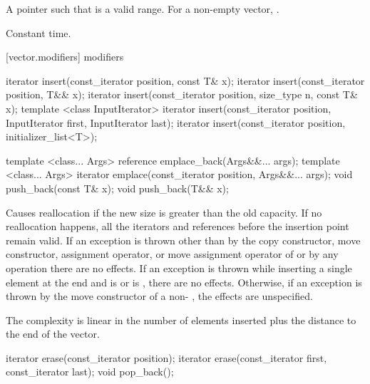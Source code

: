 \begin{itemdescr}
\pnum
\returns
A pointer such that  is a valid range. For a
non-empty vector,  \tcode{==} .

\pnum
\complexity
Constant time.
\end{itemdescr}

[vector.modifiers]{ modifiers}

%
\begin{itemdecl}
iterator insert(const_iterator position, const T& x);
iterator insert(const_iterator position, T&& x);
iterator insert(const_iterator position, size_type n, const T& x);
template <class InputIterator>
  iterator insert(const_iterator position, InputIterator first, InputIterator last);
iterator insert(const_iterator position, initializer_list<T>);

template <class... Args> reference emplace_back(Args&&... args);
template <class... Args> iterator emplace(const_iterator position, Args&&... args);
void push_back(const T& x);
void push_back(T&& x);
\end{itemdecl}

\begin{itemdescr}
\pnum
\remarks
Causes reallocation if the new size is greater than the old capacity.
If no reallocation happens, all the iterators and references before the insertion point remain valid.
If an exception is thrown other than by
the copy constructor, move constructor,
assignment operator, or move assignment operator of
 or by any  operation
there are no effects.
If an exception is thrown while inserting a single element at the end and
 is  or 
is , there are no effects.
Otherwise, if an exception is thrown by the move constructor of a non-
, the effects are unspecified.

\pnum
\complexity
The complexity is linear in the number of elements inserted plus the distance
to the end of the vector.
\end{itemdescr}

%
\begin{itemdecl}
iterator erase(const_iterator position);
iterator erase(const_iterator first, const_iterator last);
void pop_back();
\end{itemdecl}

